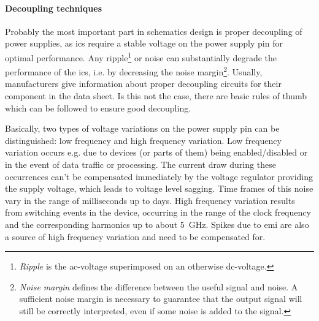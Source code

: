 \paragraph{Decoupling techniques}
Probably the most important part in schematics design is proper decoupling of power supplies, as \glspl{ic} require a stable voltage on the power supply pin for optimal performance. Any ripple\footnote{\textit{Ripple} is the \gls{ac}-voltage superimposed on an otherwise \gls{dc}-voltage.} or noise can substantially degrade the performance of the \glspl{ic}, i.e. by decreasing the noise margin\footnote{\textit{Noise margin} defines the difference between the useful signal and noise. A sufficient noise margin is necessary to guarantee that the output signal will still be correctly interpreted, even if some noise is added to the signal.}. Usually, manufacturers give information about proper decoupling circuits for their component in the data sheet. Is this not the case, there are basic rules of thumb which can be followed to ensure good decoupling. \cite{decouple}

Basically, two types of voltage variations on the power supply pin can be distinguished: low frequency and high frequency variation. Low frequency variation occurs e.g. due to devices (or parts of them) being enabled/disabled or in the event of data traffic or processing. The current draw during these occurrences can't be compensated immediately by the voltage regulator providing the supply voltage, which leads to voltage level sagging. Time frames of this noise vary in the range of milliseconds up to days. High frequency variation results from switching events in the device, occurring in the range of the clock frequency and the corresponding harmonics up to about \SI{5}{\giga \hertz}. Spikes due to \gls{emi} are also a source of high frequency variation and need to be compensated for. \cite{xilDecouple} 

